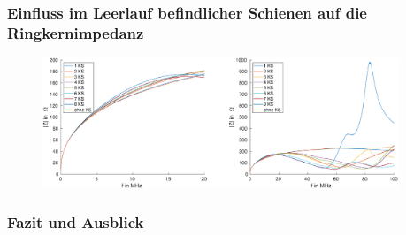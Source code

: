 \documentclass[accentcolor=tud9b, colorbacktitle, inverttitle]{tudbeamer}
\begin{document}
\begin{frame}\frametitle{Einfluss im Leerlauf befindlicher Schienen auf die Ringkernimpedanz}
\vspace{-1em}
\begin{figure}[h]
	\centering
	\includegraphics[width=0.95\textwidth]{Z_RK_numKS_open}
\end{figure}
\end{frame}



\begin{frame}\frametitle{Fazit und Ausblick}

\end{frame}

% 	 
\end{document}

